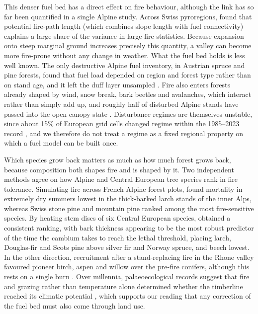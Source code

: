 \documentclass[11pt,a4paper]{article}
\begin{document}
This denser fuel bed has a direct effect on fire behaviour, although the link has so far been quantified in a single Alpine study. Across Swiss pyroregions, \citet{conedera_linking_2024} found that potential fire-path length (which combines slope length with fuel connectivity) explains a large share of the variance in large-fire statistics. Because expansion onto steep marginal ground increases precisely this quantity, a valley can become more fire-prone without any change in weather. What the fuel bed holds is less well known. The only destructive Alpine fuel inventory, in Austrian spruce and pine forests, found that fuel load depended on region and forest type rather than on stand age, and it left the duff layer unsampled \citep{neumann_fuel_2022}. Fire also enters forests already shaped by wind, snow break, bark beetles and avalanches, which interact rather than simply add up, and roughly half of disturbed Alpine stands have passed into the open-canopy state \citep{bebi_changes_2017, stritih_alternative_2023}. Disturbance regimes are themselves unstable, since about 15\% of European grid cells changed regime within the 1985--2023 record \citep{miguel_unravelling_2026}, and we therefore do not treat a regime as a fixed regional property on which a fuel model can be built once.

Which species grow back matters as much as how much forest grows back, because composition both shapes fire and is shaped by it. Two independent methods agree on how Alpine and Central European tree species rank in fire tolerance. Simulating fire across French Alpine forest plots, \citet{dupire_vulnerability_2019} found mortality in extremely dry summers lowest in the thick-barked larch stands of the inner Alps, whereas Swiss stone pine and mountain pine ranked among the most fire-sensitive species. By heating stem discs of six Central European species, \citet{mutterer_bark_2026} obtained a consistent ranking, with bark thickness appearing to be the most robust predictor of the time the cambium takes to reach the lethal threshold, placing larch, Douglas-fir and Scots pine above silver fir and Norway spruce, and beech lowest. In the other direction, recruitment after a stand-replacing fire in the Rhone valley favoured pioneer birch, aspen and willow over the pre-fire conifers, although this rests on a single burn \citep{moser_potential_2010}. Over millennia, palaeoecological records suggest that fire and grazing rather than temperature alone determined whether the timberline reached its climatic potential \citep{colombaroli_species_2010}, which supports our reading that any correction of the fuel bed must also come through land use.
\end{document}
